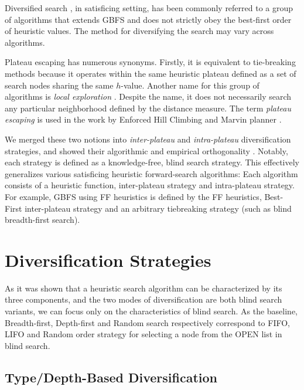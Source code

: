 Diversified search \cite{imai2011novel,valenzano2014comparison,xie14type}, in satisficing setting,
has been commonly referred to a group of algorithms that extends GBFS and does not strictly obey the
best-first order of heuristic values. The method for diversifying the search may vary
across algorithms.

Plateau escaping has numerous synonyms. Firstly, it is equivalent to tie-breaking
methods because it operates within the same heuristic plateau defined as a set of search nodes
sharing the same $h$-value. Another name for this group of algorithms is \emph{local exploration}
\cite{XieMH15,XieH14gbfsle}. Despite the name, it does not necessarily search any
particular neighborhood defined by the distance measure. The term \emph{plateau escaping} is used in
the work by Enforced Hill Climbing \cite{Hoffmann01} and Marvin planner \cite{Coles07}.

We merged these two notions into \emph{inter-plateau} and \emph{intra-plateau} diversification
strategies, and showed their algorithmic and empirical orthogonality \cite{Asai2017b}. Notably, each
strategy is defined as a knowledge-free, blind search strategy. This effectively generalizes various
satisficing heuristic forward-search algorithms: Each algorithm consists of a heuristic function,
inter-plateau strategy and intra-plateau strategy. For example, GBFS using FF heuristics is defined
by the FF heuristics, Best-First inter-plateau strategy and an arbitrary tiebreaking strategy (such
as blind breadth-first search).


\section{Diversification Strategies}

\label{sec:div}

As it was shown that a heuristic search algorithm can be characterized by its three components, and
the two modes of diversification are both blind search variants, we can focus only on the
characteristics of blind search.  As the baseline, Breadth-first, Depth-first and Random search
respectively correspond to FIFO, LIFO and Random order strategy for selecting a node from the OPEN
list in blind search.

\subsection{Type/Depth-Based Diversification}

